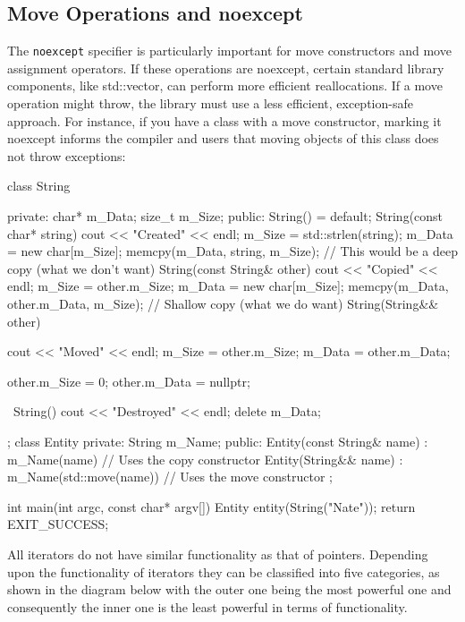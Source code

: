 \documentclass{report}
\begin{document}
    \subsection{Move Operations and noexcept}
    \bigbreak \noindent 
    \begin{concept}
        The \texttt{noexcept} specifier is particularly important for move constructors and move assignment operators. If these operations are noexcept, certain standard library components, like std::vector, can perform more efficient reallocations. If a move operation might throw, the library must use a less efficient, exception-safe approach.
        \bigbreak \noindent 
        For instance, if you have a class with a move constructor, marking it noexcept informs the compiler and users that moving objects of this class does not throw exceptions:
    \end{concept}
    \bigbreak \noindent 
    \begin{cppcode}
class String {
private:
    char* m_Data;
    size_t m_Size;
public:
    String() = default;
    String(const char* string)  {
        cout << "Created" << endl;
        m_Size = std::strlen(string);
        m_Data = new char[m_Size];
        memcpy(m_Data, string, m_Size);
    }
    // This would be a deep copy (what we don't want)
    String(const String& other) {
        cout << "Copied" << endl;
        m_Size = other.m_Size;
        m_Data = new char[m_Size];
        memcpy(m_Data, other.m_Data, m_Size);
    }
    // Shallow copy (what we do want)
    String(String&& other) {
        cout << "Moved" << endl;
        m_Size = other.m_Size;
        m_Data = other.m_Data;

        other.m_Size = 0;
        other.m_Data = nullptr;
    }
    ~String() {
        cout << "Destroyed" << endl;
        delete m_Data;
    }
};
class Entity {
private:
    String m_Name;
public:
    Entity(const String& name) : m_Name(name) {} // Uses the copy constructor 
    Entity(String&& name) : m_Name(std::move(name)) {} // Uses the move constructor
};

int main(int argc, const char* argv[]) { Entity entity(String("Nate")); return EXIT_SUCCESS; }
    \end{cppcode}

    \pagebreak
    \bigbreak \noindent 
        \begin{concept}
        All iterators do not have similar functionality as that of pointers. Depending upon the functionality of iterators they can be classified into five categories, as shown in the diagram below with the outer one being the most powerful one and consequently the inner one is the least powerful in terms of functionality.
    \end{concept}
    \begin{figure}[ht]
        \centering
        \label{fig:iterator}
    \end{figure}
    \bigbreak \noindent 
\end{document}
